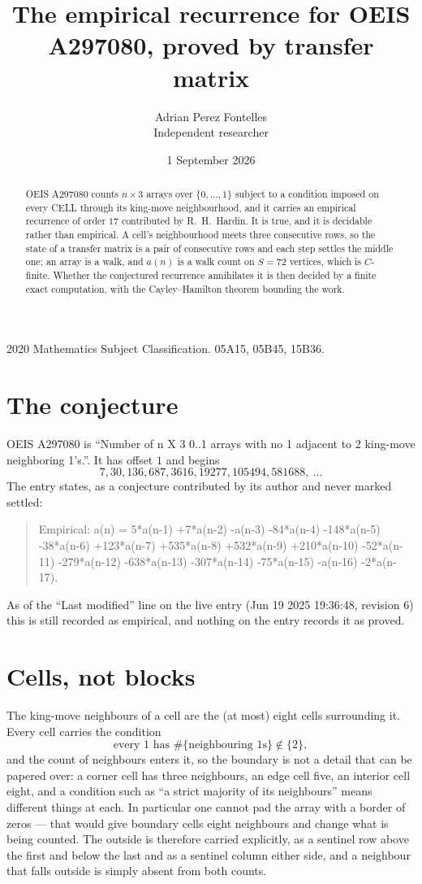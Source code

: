 \documentclass[11pt,a4paper]{article}
\title{The empirical recurrence for OEIS A297080, proved by transfer matrix}
\author{Adrian Perez Fontelles\\ \small Independent researcher}
\date{1 September 2026}
\theoremstyle{plain}
\theoremstyle{definition}
\begin{document}
\maketitle

\begin{abstract}
OEIS A297080 counts $n\times3$ arrays over $\{0,\dots,1\}$ subject to a condition imposed on
every CELL through its king-move neighbourhood, and it carries an empirical recurrence of
order $17$ contributed by R.~H.~Hardin. It is true, and it is decidable rather than
empirical. A cell's neighbourhood meets three consecutive rows, so the state of a transfer
matrix is a pair of consecutive rows and each step settles the middle one; an array is a
walk, and $a(n)$ is a walk count on $S=72$ vertices, which is $C$-finite. Whether the
conjectured recurrence annihilates it is then decided by a finite exact computation, with the
Cayley--Hamilton theorem bounding the work.
\end{abstract}

\noindent\small 2020 Mathematics Subject Classification. 05A15, 05B45, 15B36.\normalsize

\section{The conjecture}

OEIS A297080 is ``Number of n X 3 0..1 arrays with no 1 adjacent to 2 king-move neighboring 1's.''. It has offset $1$ and begins
\[
7, 30, 136, 687, 3616, 19277, 105494, 581688,\ \dots
\]
The entry states, as a conjecture contributed by its author and never marked settled:
\begin{quote}
Empirical: a(n) = 5*a(n-1) +7*a(n-2) -a(n-3) -84*a(n-4) -148*a(n-5) -38*a(n-6) +123*a(n-7) +535*a(n-8) +532*a(n-9) +210*a(n-10) -52*a(n-11) -279*a(n-12) -638*a(n-13) -307*a(n-14) -75*a(n-15) -a(n-16) -2*a(n-17).
\end{quote}
As of the ``Last modified'' line on the live entry (Jun 19 2025 19:36:48, revision 6) this is still
recorded as empirical, and nothing on the entry records it as proved.

\section{Cells, not blocks}

The king-move neighbours of a cell are the (at most) eight cells surrounding it. Every cell
carries the condition
\[
\text{every }1\text{ has }\#\{\text{neighbouring }1\text{s}\}\notin\{2\},
\]
and the count of neighbours enters it, so the boundary is not a detail that can be papered
over: a corner cell has three neighbours, an edge cell five, an interior cell eight, and a
condition such as ``a strict majority of its neighbours'' means different things at each. In
particular one cannot pad the array with a border of zeros --- that would give boundary cells
eight neighbours and change what is being counted. The outside is therefore carried
explicitly, as a sentinel row above the first and below the last and as a sentinel column
either side, and a neighbour that falls outside is simply absent from both counts.
\end{document}
